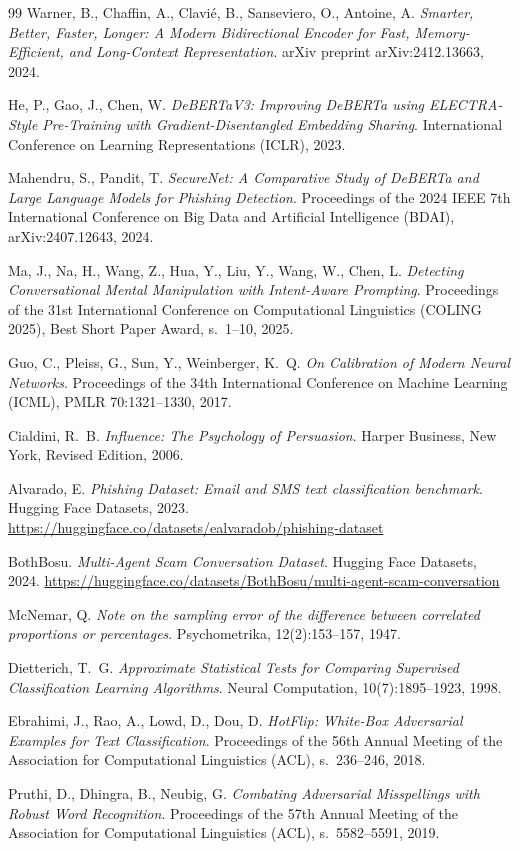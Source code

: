 \documentclass[12pt,a4paper,twoside]{report}
\begin{document}
\begin{thebibliography}{99}
  Warner, B., Chaffin, A., Clavi{\'e}, B., Sanseviero, O., Antoine, A.
  \textit{Smarter, Better, Faster, Longer: A Modern Bidirectional Encoder for Fast, Memory-Efficient, and Long-Context Representation}.
  arXiv preprint arXiv:2412.13663, 2024.

  He, P., Gao, J., Chen, W.
  \textit{DeBERTaV3: Improving DeBERTa using ELECTRA-Style Pre-Training with Gradient-Disentangled Embedding Sharing}.
  International Conference on Learning Representations (ICLR), 2023.

  Mahendru, S., Pandit, T.
  \textit{SecureNet: A Comparative Study of DeBERTa and Large Language Models for Phishing Detection}.
  Proceedings of the 2024 IEEE 7th International Conference on Big Data and Artificial Intelligence (BDAI), arXiv:2407.12643, 2024.

  Ma, J., Na, H., Wang, Z., Hua, Y., Liu, Y., Wang, W., Chen, L.
  \textit{Detecting Conversational Mental Manipulation with Intent-Aware Prompting}.
  Proceedings of the 31st International Conference on Computational Linguistics (COLING 2025), Best Short Paper Award, s.~1--10, 2025.

  Guo, C., Pleiss, G., Sun, Y., Weinberger, K.~Q.
  \textit{On Calibration of Modern Neural Networks}.
  Proceedings of the 34th International Conference on Machine Learning (ICML), PMLR 70:1321--1330, 2017.

  Cialdini, R.~B.
  \textit{Influence: The Psychology of Persuasion}.
  Harper Business, New York, Revised Edition, 2006.

  Alvarado, E.
  \textit{Phishing Dataset: Email and SMS text classification benchmark}.
  Hugging Face Datasets, 2023. \url{https://huggingface.co/datasets/ealvaradob/phishing-dataset}

  BothBosu.
  \textit{Multi-Agent Scam Conversation Dataset}.
  Hugging Face Datasets, 2024. \url{https://huggingface.co/datasets/BothBosu/multi-agent-scam-conversation}

  McNemar, Q.
  \textit{Note on the sampling error of the difference between correlated proportions or percentages}.
  Psychometrika, 12(2):153--157, 1947.

  Dietterich, T.~G.
  \textit{Approximate Statistical Tests for Comparing Supervised Classification Learning Algorithms}.
  Neural Computation, 10(7):1895--1923, 1998.

  Ebrahimi, J., Rao, A., Lowd, D., Dou, D.
  \textit{HotFlip: White-Box Adversarial Examples for Text Classification}.
  Proceedings of the 56th Annual Meeting of the Association for Computational Linguistics (ACL), s.~236--246, 2018.

  Pruthi, D., Dhingra, B., Neubig, G.
  \textit{Combating Adversarial Misspellings with Robust Word Recognition}.
  Proceedings of the 57th Annual Meeting of the Association for Computational Linguistics (ACL), s.~5582--5591, 2019.

\end{thebibliography}
\end{document}
